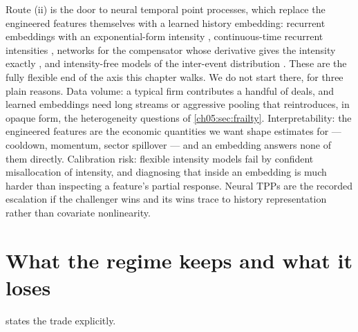 Route (ii) is the door to neural temporal point processes, which
replace the engineered features themselves with a learned history
embedding: recurrent embeddings with an exponential-form intensity
\citep{du2016}, continuous-time recurrent intensities
\citep{meieisner2017}, networks for the compensator whose derivative
gives the intensity exactly \citep{omi2019}, and intensity-free models
of the inter-event distribution \citep{shchur2020}. These are the fully
flexible end of the axis this chapter walks. We do not start there, for
three plain reasons. Data volume: a typical firm contributes a handful
of deals, and learned embeddings need long streams or aggressive pooling
that reintroduces, in opaque form, the heterogeneity questions of
\cref{ch05:sec:frailty}. Interpretability: the engineered features are
the economic quantities we want shape estimates for --- cooldown,
momentum, sector spillover --- and an embedding answers none of them
directly. Calibration risk: flexible intensity models fail by confident
misallocation of intensity, and diagnosing that inside an embedding is
much harder than inspecting a feature's partial response. Neural TPPs
are the recorded escalation if the challenger wins and its wins trace to
history representation rather than covariate nonlinearity.

\section{What the regime keeps and what it loses}\label{chnp:sec:ledger}

 states the trade explicitly.

